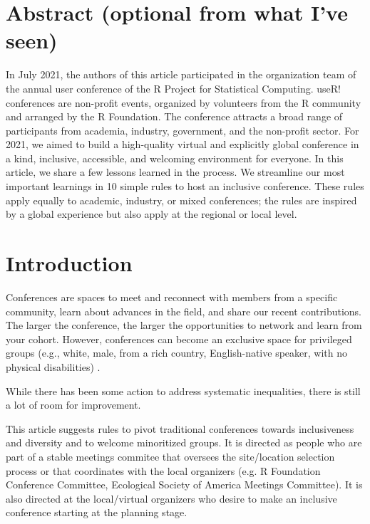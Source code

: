 \documentclass[10pt,letterpaper]{article}
\begin{document}
\section*{Abstract (optional from what I've seen)}

In July 2021, the authors of this article participated in the organization team of the annual user conference of the R Project for Statistical Computing. useR! conferences are non-profit events, organized by volunteers from the R community and arranged by the R Foundation. The conference attracts a broad range of participants from academia, industry, government, and the non-profit sector. For 2021, we aimed to build a high-quality virtual and explicitly global conference in a kind, inclusive, accessible, and welcoming environment for everyone. 
In this article, we share a few lessons learned in the process. We streamline our most important learnings in 10 simple rules to host an inclusive conference. These rules apply equally to academic, industry, or mixed conferences; the rules are inspired by a global experience but also apply at the regional or local level.



\linenumbers

\section*{Introduction}

Conferences are spaces to meet and reconnect with members from a specific community, learn about advances in the field, and share our recent contributions. The larger the conference, the larger the opportunities to network and learn from your cohort. However, conferences can become an exclusive space for privileged groups (e.g., white, male, from a rich country, English-native speaker, with no physical disabilities)  \cite{arendDisparityConferenceRegistration2019, timperleyHeMoanaPukepuke2020, gewinWhatScientistsShould2019, brownAbleismAcademiaWhere2018}.

While there has been some action to address systematic inequalities, there is still a lot of room for improvement.

This article suggests rules to pivot traditional conferences towards inclusiveness and diversity and to welcome minoritized groups. It is directed as people who are part of a stable meetings commitee that oversees the site/location selection process or that coordinates with the local organizers (e.g. R Foundation Conference Committee, Ecological Society of America Meetings Committee). It is also directed at the local/virtual organizers who desire to make an inclusive conference starting at the planning stage. 
\end{document}
